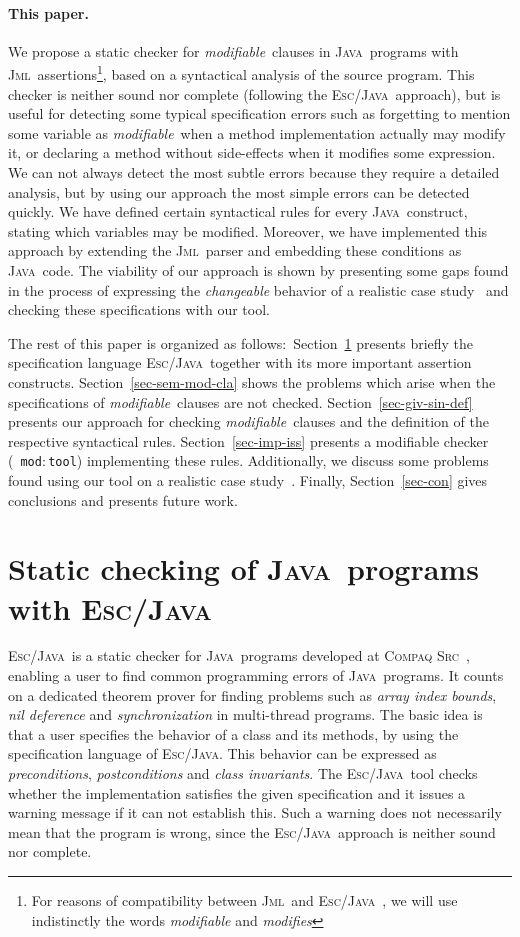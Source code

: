 \documentclass[a4paper]{llncs}
\newcommand{\jml}{\textsc{Jml}}
\newcommand{\escj}{\textsc{Esc/Java}}
\newcommand{\java}{\textsc{Java}}
\newcommand{\csrc}{\textsc{Compaq Src}}
\newcommand{\modtool}{\texttt{mod$:$tool}}
\newcommand{\modif}{\textit{modifiable}}
\begin{document}
\paragraph{\bf This paper.}We propose a static checker for
\modif~clauses in \java~programs with \jml~assertions\footnote{For
reasons of compatibility between \jml~and \escj~, we will 
use indistinctly the words \emph{modifiable} and \emph{modifies}},
based on a syntactical analysis of the source program. This
checker is neither sound nor complete (following the \escj~approach),
but is useful
for detecting some typical specification errors such as
forgetting to mention some variable
as \modif~when a method implementation actually may modify it, or
declaring a method without side-effects when it modifies some
expression. We can not always detect the most subtle errors because they 
require a detailed analysis, but by using our approach the most
simple errors can be detected quickly. We have defined certain
syntactical rules for every \java~construct, stating which
variables may be modified. Moreover, we have implemented
this approach by extending the \jml~parser and embedding these
conditions as \java~code. The viability of our approach is
shown by presenting some gaps found in the process of expressing the
\emph{changeable} behavior of a realistic case study~\cite{CatanoH02a} and
checking these specifications with our tool.


The rest of this paper is organized as follows$:$
Section~\ref{sec-esc-prg} presents briefly the specification language
\escj~together with its more important assertion
constructs. Section~\ref{sec-sem-mod-cla} shows the problems which
arise when the specifications of \modif~clauses are not
checked. Section~\ref{sec-giv-sin-def}
presents our approach for checking \modif~clauses and the definition
of the respective syntactical rules. Section~\ref{sec-imp-iss}
presents a modifiable checker (~\modtool) implementing these
rules. Additionally, we discuss some problems found using our tool on a
realistic case study~\cite{CatanoH02a}.
Finally, Section~\ref{sec-con}
gives conclusions and presents future work. 






\section{Static checking of \java~programs with \escj}
\label{sec-esc-prg}
\escj~is a static checker for \java~programs developed
at \csrc~\cite{ESCJavaUrl}, enabling a user to find common programming
errors of \java~programs. It counts on a dedicated theorem prover for
finding problems such as \emph{array index bounds},
\emph{nil deference} and \emph{synchronization} in multi-thread
programs. The basic idea is that
a user specifies the behavior of a class and its methods, by
using the specification language of \escj. This
behavior can be expressed as \textit{preconditions},
\textit{postconditions} and \textit{class invariants}. The \escj~tool
checks whether the implementation satisfies the given
specification and it issues a warning 
message if it can not establish this. Such a
warning does not necessarily mean that the program is
wrong, since the \escj~approach is neither sound nor
complete. 
\end{document}
